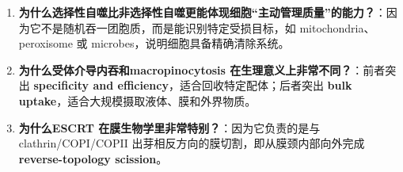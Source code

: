 \documentclass[12pt,fontset=none]{ctexart}
\begin{document}
\begin{enumerate}
\item \textbf{为什么选择性自噬比非选择性自噬更能体现细胞“主动管理质量”的能力？}：因为它不是随机吞一团胞质，而是能识别特定受损目标，如 mitochondria、peroxisome 或 microbes，说明细胞具备精确清除系统。

\item \textbf{为什么受体介导内吞和macropinocytosis 在生理意义上非常不同？}：前者突出 \textbf{specificity and efficiency}，适合回收特定配体；后者突出 \textbf{bulk uptake}，适合大规模摄取液体、膜和外界物质。

\item \textbf{为什么ESCRT 在膜生物学里非常特别？}：因为它负责的是与 clathrin/COPI/COPII 出芽相反方向的膜切割，即从膜颈内部向外完成 \textbf{reverse-topology scission}。
\end{enumerate}
\end{document}
